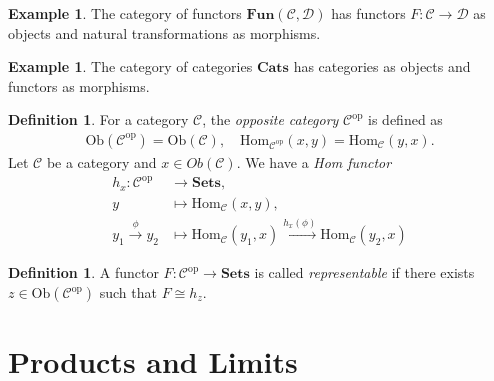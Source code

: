 \documentclass[12pt]{report}
\theoremstyle{plain}
\theoremstyle{remark}
\theoremstyle{definition}
\newtheorem{definition}[theorem]{Definition}
\newtheorem{example}[theorem]{Example}
\begin{document}
\begin{example}
    The category of functors $\mathbf{Fun}(\mathcal{C},\mathcal{D})$ has functors $F:\mathcal{C}\rightarrow\mathcal{D}$ as objects and natural transformations as morphisms.
\end{example}

\begin{example}
    The category of categories $\mathbf{Cats}$ has categories as objects and functors as morphisms.
\end{example}

\begin{definition}
    For a category $\mathcal{C}$, the \emph{opposite category} $\mathcal{C}^\mathrm{op}$ is defined as
    \begin{align*}
        \mathrm{Ob}(\mathcal{C}^\mathrm{op}) = \mathrm{Ob}(\mathcal{C}),\quad \mathrm{Hom}_{\mathcal{C}^\mathrm{op}}(x,y) = \mathrm{Hom}_\mathcal{C}(y,x).
    \end{align*}
    Let $\mathcal{C}$ be a category and $x\in Ob(\mathcal{C})$. We have a \emph{Hom functor}
    \begin{align*}
        h_x : \mathcal{C}^\mathrm{op} &\rightarrow \mathbf{Sets}, \\
        y&\mapsto \mathrm{Hom}_\mathcal{C}(x,y), \\
        y_1\stackrel{\phi}{\rightarrow} y_2 &\mapsto \mathrm{Hom}_\mathcal{C}(y_1,x)\stackrel{h_x(\phi)}{\rightarrow} \mathrm{Hom}_\mathcal{C}(y_2,x)
    \end{align*}
\end{definition}

\begin{definition}
    A functor $F:\mathcal{C}^\mathrm{op} \rightarrow \mathbf{Sets}$ is called \emph{representable} if there exists $z\in\mathrm{Ob}(\mathcal{C}^\mathrm{op})$ such that $F\cong h_z$.
\end{definition}




\section{Products and Limits}
\end{document}
